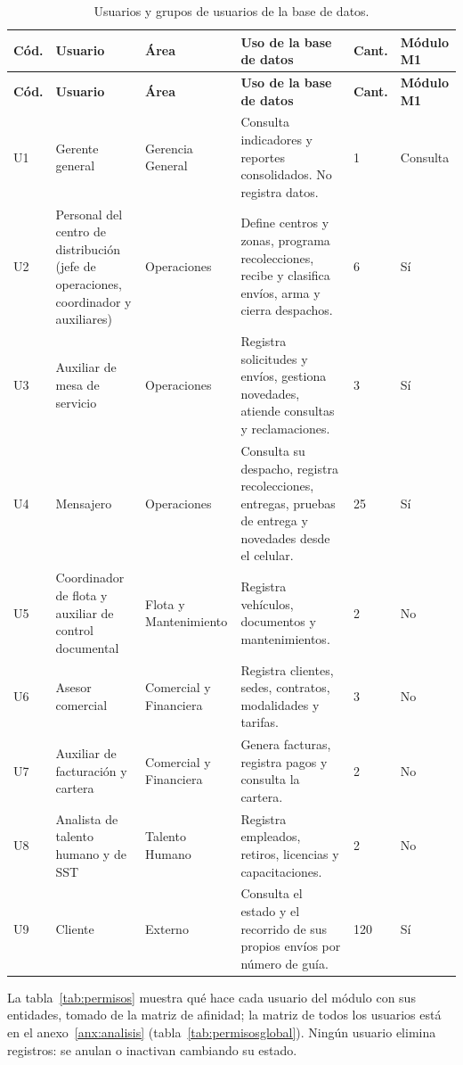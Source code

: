 {\singlespacing\small
\begin{longtable}{L{0.8cm} L{2.9cm} L{2.2cm} L{4.6cm} L{0.9cm} L{1.4cm}}
\caption{Usuarios y grupos de usuarios de la base de datos.}
\label{tab:usuarios}\\
\toprule
\textbf{Cód.} & \textbf{Usuario} & \textbf{Área} & \textbf{Uso de la base de datos} & \textbf{Cant.} & \textbf{Módulo M1} \\
\midrule
\endfirsthead
\toprule
\textbf{Cód.} & \textbf{Usuario} & \textbf{Área} & \textbf{Uso de la base de datos} & \textbf{Cant.} & \textbf{Módulo M1} \\
\midrule
\endhead
\bottomrule
\endfoot
U1 & Gerente general & Gerencia General & Consulta indicadores y reportes consolidados. No registra datos. & 1 & Consulta \\
U2 & Personal del centro de distribución (jefe de operaciones, coordinador y auxiliares) & Operaciones & Define centros y zonas, programa recolecciones, recibe y clasifica envíos, arma y cierra despachos. & 6 & Sí \\
U3 & Auxiliar de mesa de servicio & Operaciones & Registra solicitudes y envíos, gestiona novedades, atiende consultas y reclamaciones. & 3 & Sí \\
U4 & Mensajero & Operaciones & Consulta su despacho, registra recolecciones, entregas, pruebas de entrega y novedades desde el celular. & 25 & Sí \\
U5 & Coordinador de flota y auxiliar de control documental & Flota y Mantenimiento & Registra vehículos, documentos y mantenimientos. & 2 & No \\
U6 & Asesor comercial & Comercial y Financiera & Registra clientes, sedes, contratos, modalidades y tarifas. & 3 & No \\
U7 & Auxiliar de facturación y cartera & Comercial y Financiera & Genera facturas, registra pagos y consulta la cartera. & 2 & No \\
U8 & Analista de talento humano y de SST & Talento Humano & Registra empleados, retiros, licencias y capacitaciones. & 2 & No \\
U9 & Cliente & Externo & Consulta el estado y el recorrido de sus propios envíos por número de guía. & 120 & Sí \\
\end{longtable}
\par}
La tabla~\ref{tab:permisos} muestra qué hace cada usuario del módulo con
sus entidades, tomado de la matriz de afinidad; la matriz de todos los
usuarios está en el anexo~\ref{anx:analisis}
(tabla~\ref{tab:permisosglobal}). Ningún usuario elimina registros: se
anulan o inactivan cambiando su estado.

